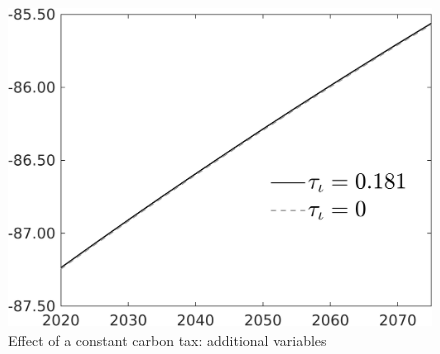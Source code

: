 %
%

\begin{figure}[h!!]
	\centering
	\caption{Effect of a constant carbon tax: additional variables }\label{fig:Leveltauf_nsk0_xgr0_add}
	\begin{minipage}[]{0.32\textwidth}
		\includegraphics[width=1\textwidth]{../../codding_model/own_basedOnFried/optimalPol_010922_revision/figures/all_13Sept22/PerdifNoTauf_regime0_CompTaul_sff_spillover0_nsk0_xgr0_knspil0_sep0_LFlimit0_emsbase0_countec0_GovRev0_etaa0.79_lgd1.png}
	\end{minipage}
	\begin{minipage}[]{0.32\textwidth}

\end{minipage}
\end{figure}
